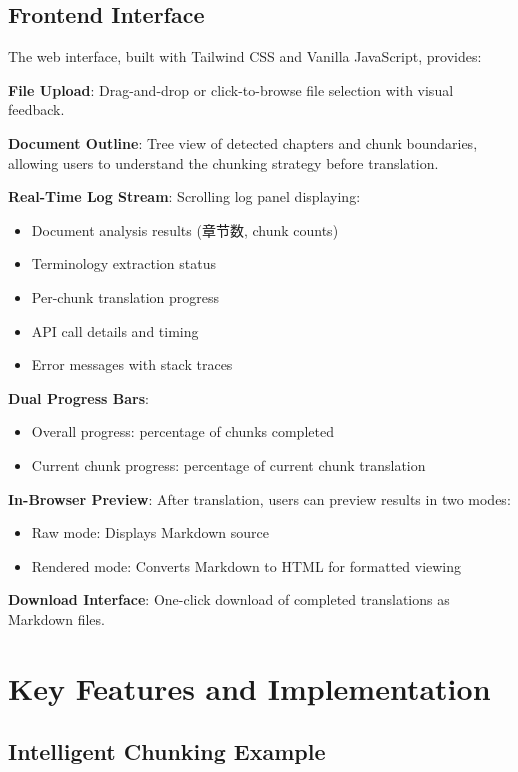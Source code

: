\documentclass[11pt]{article}
\begin{document}
\subsection{Frontend Interface}

The web interface, built with Tailwind CSS and Vanilla JavaScript, provides:

\textbf{File Upload}: Drag-and-drop or click-to-browse file selection with visual feedback.

\textbf{Document Outline}: Tree view of detected chapters and chunk boundaries, allowing users to understand the chunking strategy before translation.

\textbf{Real-Time Log Stream}: Scrolling log panel displaying:
\begin{itemize}
    \item Document analysis results (章节数, chunk counts)
    \item Terminology extraction status
    \item Per-chunk translation progress
    \item API call details and timing
    \item Error messages with stack traces
\end{itemize}

\textbf{Dual Progress Bars}: 
\begin{itemize}
    \item Overall progress: percentage of chunks completed
    \item Current chunk progress: percentage of current chunk translation
\end{itemize}

\textbf{In-Browser Preview}: After translation, users can preview results in two modes:
\begin{itemize}
    \item Raw mode: Displays Markdown source
    \item Rendered mode: Converts Markdown to HTML for formatted viewing
\end{itemize}

\textbf{Download Interface}: One-click download of completed translations as Markdown files.

\section{Key Features and Implementation}

\subsection{Intelligent Chunking Example}
\end{document}
